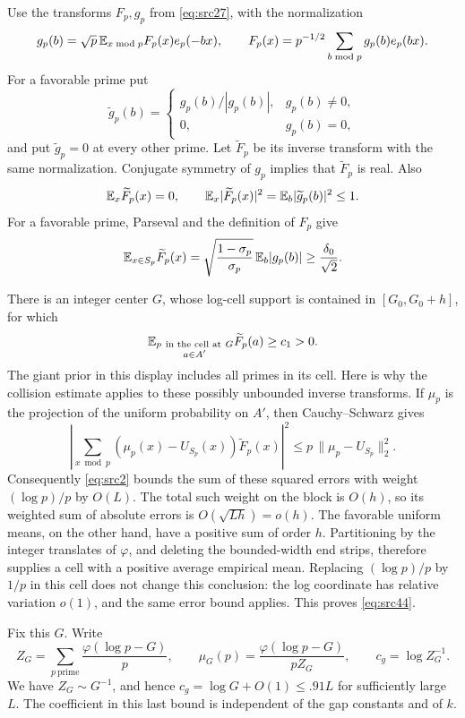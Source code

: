 Use the transforms $F_p,g_p$ from \eqref{eq:src27}, with the
normalization
\[
 g_p(b)=\sqrt p\,\mathbb E_{x\bmod p}F_p(x)e_p(-bx),\qquad
 F_p(x)=p^{-1/2}\sum_{b\bmod p}g_p(b)e_p(bx).
\]
For a favorable prime put
\[
 \widetilde g_p(b)=
 \begin{cases}
   g_p(b)/|g_p(b)|,&g_p(b)\ne0,\\
   0,&g_p(b)=0,
 \end{cases}
\]
and put $\widetilde g_p=0$ at every other prime.  Let
$\widetilde F_p$ be its inverse transform with the same
normalization.  Conjugate symmetry of $g_p$ implies that
$\widetilde F_p$ is real.  Also
\[
 \mathbb E_x\widetilde F_p(x)=0,
 \qquad \mathbb E_x|\widetilde F_p(x)|^2
      =\mathbb E_b|\widetilde g_p(b)|^2\le1.
\]
For a favorable prime, Parseval and the definition of $F_p$ give
\[
 \mathbb E_{x\in S_p}\widetilde F_p(x)
   =\sqrt{\frac{1-\sigma_p}{\sigma_p}}\,
        \mathbb E_b|g_p(b)|\ge\frac{\delta_0}{\sqrt2}.
\]

There is an integer center $G$, whose log-cell support is contained
in $[G_0,G_0+h]$, for which
\begin{equation}
 \mathbb E_{\substack{p\ \text{in the cell at}\ G\\a\in A'}}
                     \widetilde F_p(a)\ge c_1>0.
 \label{eq:src44}
\end{equation}
The giant prior in this display includes all primes in its cell.
Here is why the collision estimate applies to these possibly
unbounded inverse transforms.  If $\mu_p$ is the projection of the
uniform probability on $A'$, then Cauchy--Schwarz gives
\[
 \left|\sum_{x\bmod p}
    (\mu_p(x)-U_{S_p}(x))\widetilde F_p(x)\right|^2
       \le p\,\|\mu_p-U_{S_p}\|_2^2.
\]
Consequently \eqref{eq:src2} bounds the sum of these squared errors
with weight $(\log p)/p$ by $O(L)$.  The total such weight on the
block is $O(h)$, so its weighted sum of absolute errors is
$O(\sqrt{Lh})=o(h)$.  The favorable uniform means, on the other
hand, have a positive sum of order $h$.  Partitioning by the integer
translates of $\varphi$, and deleting the bounded-width end strips,
therefore supplies a cell with a positive average empirical mean.
Replacing $(\log p)/p$ by $1/p$ in this cell does not change this
conclusion: the log coordinate has relative variation $o(1)$, and
the same error bound applies.  This proves \eqref{eq:src44}.

Fix this $G$.  Write
\begin{equation}
 Z_G=\sum_{p\ \text{prime}}\frac{\varphi(\log p-G)}p,
 \qquad
 \mu_G(p)=\frac{\varphi(\log p-G)}{pZ_G},
 \qquad c_g=\log Z_G^{-1}.
 \label{eq:construction-giant-prior}
\end{equation}
We have $Z_G\sim G^{-1}$, and hence
$c_g=\log G+O(1)\le .91L$ for sufficiently large $L$.
The coefficient in this last bound is independent of the gap
constants and of $k$.


